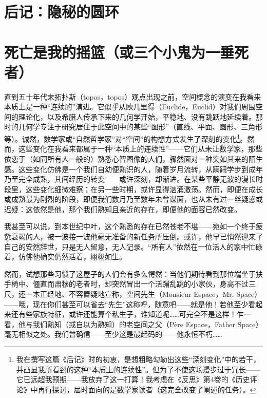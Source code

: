 \section*{后记：隐秘的圆环}

\section{死亡是我的摇篮（或三个小鬼为一垂死者）}

直到五十年代末拓扑斯（topos，topos）观点出现之前，空间概念的演变在我看来本质上是一种“连续的”演进。它似乎从欧几里得（Euclide，Euclid）对我们周围空间的理论化，以及希腊人传承下来的几何学开始，平稳地、没有跳跃地延续着。那时的几何学专注于研究居住于此空间中的某些“图形”（直线、平面、圆形、三角形等）。诚然，数学家或“自然哲学家”对“空间”的构想方式发生了深刻的变化\footnote{我在撰写这篇《后记》时的初衷，是想粗略勾勒出这些“深刻变化”中的若干，并凸显我所看到的这种“本质上的连续性”。但为了不使这场漫步过于冗长——它已远超我预期——我放弃了这一打算！我考虑在《反思》第4卷的《历史评论》中再行探讨，届时面向的是数学家读者（这完全改变了阐述的任务）。}。然而，这些变化在我看来都属于一种“本质上的连续性”——它们从未让数学家，那些依恋于（如同所有人一般的）熟悉心智图像的人们，骤然面对一种突如其来的陌生感。这些变化仿佛是一个我们自幼便熟识的人，随着岁月流转，从蹒跚学步到成年乃至完全成熟，其间经历的转变——或许深刻，却渐进。在某些平静无波的漫长时段里，这些变化细微难察；在另一些时期，或许显得汹涌激荡。然而，即便在成长或成熟最为剧烈的阶段，即便我们数月乃至数年未曾谋面，也从未有过一丝疑惑或迟疑：这依然是他，那个我们熟知且亲近的存在，即便他的面容已然改变。

我甚至可以说，到本世纪中叶，这个熟悉的存在已然苍老不堪——宛如一个终于疲惫衰竭的人，被一波接一波他毫无准备的新任务所压倒。或许，他早已悄然迎来了自己的安然辞世，只是无人留意，无人记录。“所有人”依然在一位活人的家中忙碌着，仿佛他确实仍然活着，栩栩如生。

然而，试想那些习惯了这屋子的人们会有多么愕然：当他们期待看到那位端坐于扶手椅中、僵直而肃穆的老者时，却突然冒出一个活蹦乱跳的小家伙，身高不过三尺，还一本正经地、不容置疑地宣称，空间先生（Monsieur Espace，Mr. Space）——哦，现在你们甚至可以省去“先生”这称呼，随意吧——就是他！若他至少看起来还有些家族特征，或许还能算个私生子，谁知道呢……可完全不是这样！乍一看，他与我们熟知（或自以为熟知）的老空间之父（Père Espace，Father Space）毫无相似之处。我们曾确信——至少这是最起码的——他永恒不朽……

